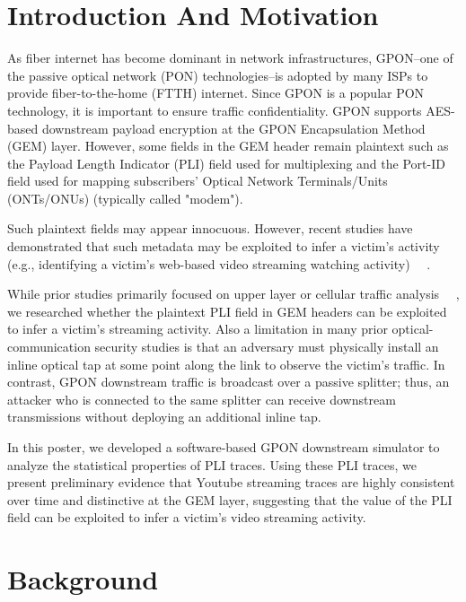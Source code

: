 \documentclass[sigconf]{acmart}
\begin{document}
\maketitle

\section{Introduction And Motivation}
As fiber internet has become dominant in network infrastructures, GPON--one of the passive optical network (PON) technologies--is adopted by many ISPs to provide fiber-to-the-home (FTTH) internet. Since GPON is a popular PON technology, it is important to ensure traffic confidentiality. 
 GPON supports AES-based downstream payload encryption at the GPON Encapsulation Method (GEM) layer. However, some fields in the GEM header remain plaintext such as the Payload Length Indicator (PLI) field used for multiplexing and the Port-ID field used for mapping subscribers' Optical Network Terminals/Units (ONTs/ONUs) (typically called "modem").

Such plaintext fields may appear innocuous. However, recent studies have demonstrated that such metadata may be exploited to infer a victim's activity (e.g., identifying a victim's web-based video streaming watching activity) ~\cite{bae-sec22}~\cite{ytyt}.

While prior studies primarily focused on upper layer or cellular traffic analysis~\cite{bae-sec22}~\cite{ytyt} , we researched whether the plaintext PLI field in GEM headers can be exploited to infer a victim's streaming activity. 
Also a limitation in many prior optical-communication security studies is that an adversary must physically install an inline optical tap at some point along the link to observe the victim's traffic. In contrast, GPON downstream traffic is broadcast over a passive splitter; thus, an attacker who is connected to the same splitter can receive downstream transmissions without deploying an additional inline tap.

In this poster, we developed a software-based GPON downstream simulator to analyze the statistical properties of PLI traces. Using these PLI traces, we present preliminary evidence that Youtube streaming traces are highly consistent over time and distinctive at the GEM layer, suggesting that the value of the PLI field can be exploited to infer a victim's video streaming activity.
\section{Background}  
\end{document}
